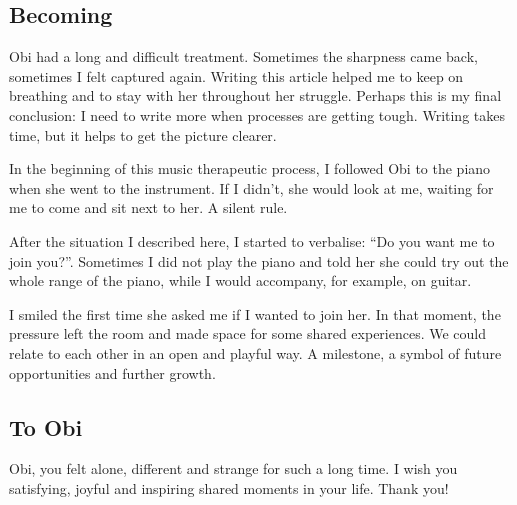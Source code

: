 \documentclass[authordate, empirical, issue]{jote-new-article}
\begin{document}
\begin{itemize}
\end{itemize}





\subsection{Becoming}

Obi had a long and difficult treatment. Sometimes the sharpness came back, sometimes I felt captured again. Writing this article helped me to keep on breathing and to stay with her throughout her struggle. Perhaps this is my final conclusion: I need to write more when processes are getting tough. Writing takes time, but it helps to get the picture clearer.







In the beginning of this music therapeutic process, I followed Obi to the piano when she went to the instrument. If I didn't, she would look at me, waiting for me to come and sit next to her. A silent rule.



After the situation I described here, I started to verbalise: “Do you want me to join you?”. Sometimes I did not play the piano and told her she could try out the whole range of the piano, while I would accompany, for example, on guitar.



I smiled the first time she asked me if I wanted to join her. In that moment, the pressure left the room and made space for some shared experiences. We could relate to each other in an open and playful way. A milestone, a symbol of future opportunities and further growth.







\subsection{To Obi}

Obi, you felt alone, different and strange for such a long time. I wish you satisfying, joyful and inspiring shared moments in your life. Thank you!
\end{document}
